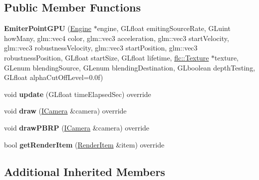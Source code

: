 \subsection*{Public Member Functions}
\begin{DoxyCompactItemize}
\item 
{\bfseries Emiter\+Point\+G\+PU} (\hyperlink{classflw_1_1Engine}{Engine} $\ast$engine, G\+Lfloat emiting\+Source\+Rate, G\+Luint how\+Many, glm\+::vec4 color, glm\+::vec3 acceleration, glm\+::vec3 start\+Velocity, glm\+::vec3 robustness\+Velocity, glm\+::vec3 start\+Position, glm\+::vec3 robustness\+Position, G\+Lfloat start\+Size, G\+Lfloat lifetime, \hyperlink{classflw_1_1flc_1_1Texture}{flc\+::\+Texture} $\ast$texture, G\+Lenum blending\+Source, G\+Lenum blending\+Destination, G\+Lboolean depth\+Testing, G\+Lfloat alpha\+Cut\+Off\+Level=0.\+0f)\hypertarget{classflw_1_1flf_1_1EmiterPointGPU_a63b5c560ccc89f38bd0c974372eda1cf}{}\label{classflw_1_1flf_1_1EmiterPointGPU_a63b5c560ccc89f38bd0c974372eda1cf}

\item 
void {\bfseries update} (G\+Lfloat time\+Elapsed\+Sec) override\hypertarget{classflw_1_1flf_1_1EmiterPointGPU_a6c816e0fb1b4626c814012dcf3d81d10}{}\label{classflw_1_1flf_1_1EmiterPointGPU_a6c816e0fb1b4626c814012dcf3d81d10}

\item 
void {\bfseries draw} (\hyperlink{classflw_1_1flf_1_1ICamera}{I\+Camera} \&camera) override\hypertarget{classflw_1_1flf_1_1EmiterPointGPU_ae6a1e9b822d2d121f5c9403a3a032d2a}{}\label{classflw_1_1flf_1_1EmiterPointGPU_ae6a1e9b822d2d121f5c9403a3a032d2a}

\item 
void {\bfseries draw\+P\+B\+RP} (\hyperlink{classflw_1_1flf_1_1ICamera}{I\+Camera} \&camera) override\hypertarget{classflw_1_1flf_1_1EmiterPointGPU_a7233c34c58d55abd33c7cbfcbffe272b}{}\label{classflw_1_1flf_1_1EmiterPointGPU_a7233c34c58d55abd33c7cbfcbffe272b}

\item 
bool {\bfseries get\+Render\+Item} (\hyperlink{structflw_1_1flf_1_1RenderItem}{Render\+Item} \&item) override\hypertarget{classflw_1_1flf_1_1EmiterPointGPU_a1a3f0a9adb28d5051b767d4c18b6c51f}{}\label{classflw_1_1flf_1_1EmiterPointGPU_a1a3f0a9adb28d5051b767d4c18b6c51f}

\end{DoxyCompactItemize}
\subsection*{Additional Inherited Members}


